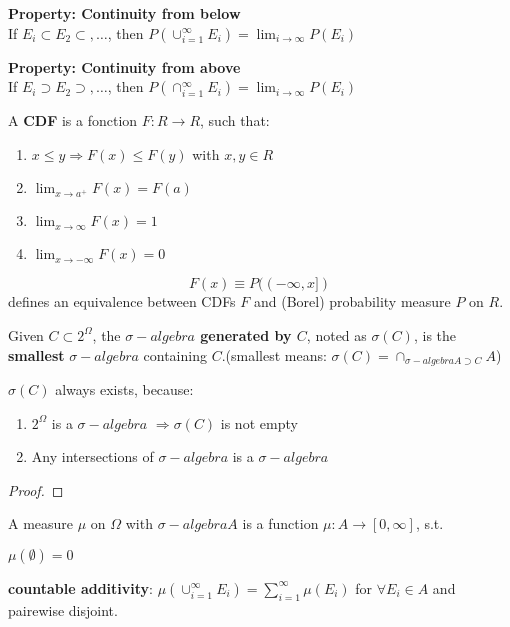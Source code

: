 \documentclass{article}
\begin{document}
\textbf{Property: Continuity from below}\\
If $E_i \subset E_2 \subset,\ldots $, then $P(\cup_{i=1}^{\infty} E_i) = \lim_{i \to \infty} P(E_i)$

\textbf{Property: Continuity from above}\\
If $E_i \supset E_2 \supset,\ldots $, then $P(\cap_{i=1}^{\infty} E_i) = \lim_{i \to \infty} P(E_i)$

\begin{definition}
A \textbf{CDF} is a fonction $F: R \rightarrow R$, such that:
\begin{enumerate}
\item $x \leq y \Rightarrow F(x) \leq F(y)$ with $x,y \in R$
\item $\lim_{x \to a^{+}}F(x) = F(a)$
\item $\lim_{x \to \infty}F(x) = 1$
\item $\lim_{x \to -\infty}F(x) = 0$
\end{enumerate}
\end{definition}

\begin{theorem}
$$F(x) \equiv P((-\infty, x])$$
defines an equivalence between CDFs $F$ and (Borel) probability measure $P$ on $R$.
\end{theorem}

\begin{definition}
Given $C \subset 2^{\Omega}$, the \textbf{$\sigma-algebra$ generated by $C$}, noted as $\sigma(C)$, is the \textbf{smallest} $\sigma-algebra$ containing $C$.(smallest means: $\sigma(C) = \cap_{\sigma-algebra A \supset C} A$)
\end{definition}

$\sigma(C)$ always exists, because:
\begin{enumerate}
\item $2^{\Omega}$ is a $\sigma-algebra$ $\Rightarrow \sigma(C)$ is not empty
\item Any intersections of $\sigma-algebra$ is a $\sigma-algebra$
\end{enumerate}
\begin{proof}
\end{proof}

\begin{definition}
A measure $\mu$ on $\Omega$ with $\sigma-algebra A$ is a function $\mu: A \rightarrow [0, \infty]$, s.t.
\item $\mu(\emptyset) = 0$
\item \textbf{countable additivity}: $\mu(\cup_{i=1}^{\infty} E_i) = \sum_{i=1}^{\infty}\mu(E_i)$ for $\forall E_i \in A$ and pairewise disjoint.
\end{definition}
\end{document}

